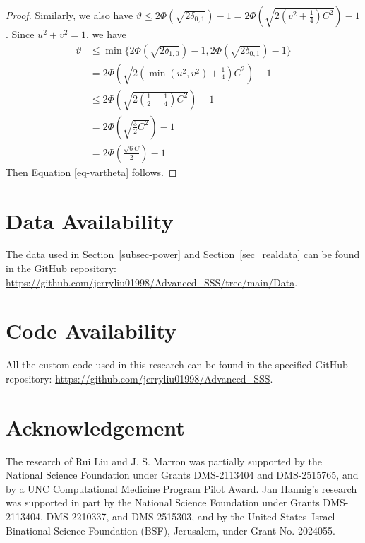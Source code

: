\documentclass{article}
\begin{document}
\begin{appendices}
\begin{proof}
		Similarly, we also have $\vartheta\leq2\Phi(\sqrt{2\delta_{0,1}})-1=2\Phi(\sqrt{2(v^2+\frac{1}{4})C^2})-1$. Since $u^2+v^2=1$, we have 
		\begin{equation*}
			\begin{aligned}
				\vartheta&\leq\min\{2\Phi(\sqrt{2\delta_{1,0}})-1,2\Phi(\sqrt{2\delta_{0,1}})-1\}\\
				&=2\Phi(\sqrt{2(\min(u^2,v^2)+\frac{1}{4})C^2})-1\\
				&\leq2\Phi(\sqrt{2(\frac{1}{2}+\frac{1}{4})C^2})-1\\
				&=2\Phi(\sqrt{\frac{3}{2}C^2})-1\\
				&=2\Phi(\frac{\sqrt{6}C}{2})-1
			\end{aligned} 
		\end{equation*}
		Then Equation \ref{eq-vartheta} follows.
	\end{proof}
\end{appendices}

\section*{Data Availability}
The data used in Section~\ref{subsec-power} and Section~\ref{sec_realdata} can be found in the GitHub repository: \url{https://github.com/jerryliu01998/Advanced_SSS/tree/main/Data}.

\section*{Code Availability}
All the custom code used in this research can be found in the specified GitHub repository: \url{https://github.com/jerryliu01998/Advanced_SSS}.

\section*{Acknowledgement}
The research of Rui Liu and  J. S. Marron  was partially supported by the National Science Foundation under Grants DMS-2113404 and DMS-2515765, and by a UNC Computational Medicine Program Pilot Award. Jan Hannig’s research was supported in part by the National Science Foundation under Grants DMS-2113404, DMS-2210337, and DMS-2515303, and by the United States–Israel Binational Science Foundation (BSF), Jerusalem, under Grant No. 2024055.



\end{document}
